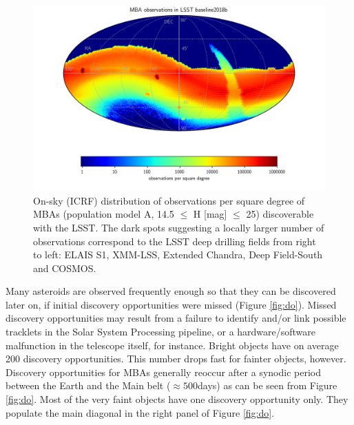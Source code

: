 \begin{figure}
\begin{center}
\includegraphics[width=0.70\linewidth]{figs/mba_obs_hpmap.png}
\end{center}
\caption{On-sky (ICRF) distribution of observations per square degree of MBAs (population model A, 14.5 $\le$ H [mag] $\le$ 25) discoverable with the \gls{LSST}. The dark spots suggesting a locally larger number of observations correspond to the \gls{LSST} deep drilling fields from right to left: ELAIS S1, \gls{XMM}-LSS, Extended Chandra, Deep Field-South and COSMOS.}
\label{fig:mba_obs_sky}       %
\end{figure}
%
Many asteroids are observed frequently enough so that they can be discovered later on, if initial discovery opportunities were missed (Figure \ref{fig:do}). Missed discovery opportunities may result from a failure to identify and/or link possible tracklets in the Solar System Processing \gls{pipeline}, or a hardware/software malfunction in the telescope itself, for instance. Bright objects have on average 200 discovery opportunities. This number drops fast for fainter objects, however. Discovery opportunities for MBAs generally reoccur after a synodic period between the Earth and the Main belt ($\approx 500$days) as can be seen from Figure \ref{fig:do}. Most of the very faint objects have one discovery opportunity only. They populate the main diagonal in the right panel of Figure \ref{fig:do}.
%
